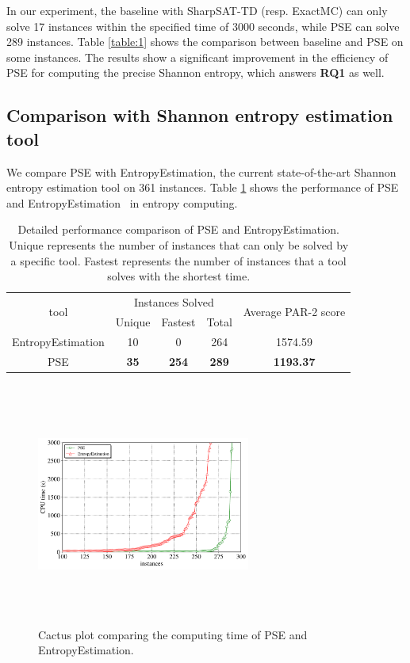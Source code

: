 In our experiment, the baseline with SharpSAT-TD (resp. ExactMC) can only solve 17 instances within the specified time of 3000 seconds, while PSE can solve 289 instances. 
Table \ref{table:1} shows the comparison between baseline and PSE on some instances.
The results show a significant improvement in the efficiency of PSE for computing the precise Shannon entropy, which answers \textbf{RQ1} as well.


\subsection{Comparison with Shannon entropy estimation tool}
We compare PSE with EntropyEstimation, the current state-of-the-art Shannon entropy estimation tool on 361 instances. 
Table \ref{table:2} shows the performance of PSE and EntropyEstimation~\cite{golia2022scalable} in entropy computing.


\begin{table}[h!]
	\centering
	\begin{tabular}{ ccccc } 
		\toprule 
		\multirow{2}{*}{tool}  & \multicolumn{3}{c}{Instances Solved} & \multirow{2}{*}{Average PAR-2 score} \\
		 \cline{2-4}
		& Unique & Fastest & Total \\ 
		\midrule 
		EntropyEstimation & 10 & 0 & 264 & 1574.59 \\ 
		
		PSE & \textbf{35} & \textbf{254} & \textbf{289} & \textbf{1193.37} \\
		\bottomrule
	\end{tabular}
	\caption{Detailed performance comparison of PSE and EntropyEstimation. Unique represents the number of instances that can only be solved by a specific tool. Fastest represents the number of instances that a tool solves with the shortest time.}
	\label{table:2}
\end{table}

\begin{figure}[htbp]
	\centering
	\includegraphics[width=7cm,height=8cm]{figures/PSEvsEntropyEstimation.pdf}
	\caption{Cactus plot comparing the computing time of PSE and EntropyEstimation.
	}
	\label{figure:2}
\end{figure} 

